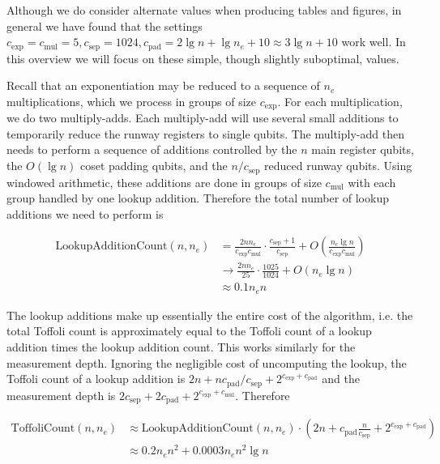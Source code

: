 \documentclass[superscriptaddress,notitlepage,longbibliography]{revtex4-1}
\theoremstyle{definition}
\theoremstyle{definition}
\newcommand{\lenexp}{{n_e}}
\newcommand{\gexp}{{c_{\text{exp}}}}
\newcommand{\gmul}{{c_{\text{mul}}}}
\newcommand{\gsep}{{c_{\text{sep}}}}
\newcommand{\gpad}{{c_{\text{pad}}}}
\begin{document}
Although we do consider alternate values when producing tables and figures, in general we have found that the settings $\gexp=\gmul=5, \gsep=1024, \gpad=2 \lg n + \lg \lenexp + 10 \approx 3 \lg n + 10$ work well.
In this overview we will focus on these simple, though slightly suboptimal, values.

Recall that an exponentiation may be reduced to a sequence of $\lenexp$ multiplications, which we process in groups of size $\gexp$.
For each multiplication, we do two multiply-adds.
Each multiply-add will use several small additions to temporarily reduce the runway registers to single qubits.
The multiply-add then needs to perform a sequence of additions controlled by the $n$ main register qubits, the $O(\lg n)$ coset padding qubits, and the $n/\gsep$ reduced runway qubits.
Using windowed arithmetic, these additions are done in groups of size $\gmul$ with each group handled by one lookup addition.
Therefore the total number of lookup additions we need to perform is

\begin{equation}
\begin{aligned}
    \text{LookupAdditionCount}(n, \lenexp)
    &= \frac{2 n \lenexp}{\gexp \gmul} \cdot \frac{\gsep + 1}{\gsep} + O\left( \frac{\lenexp \lg n}{\gexp \gmul} \right)
    \\&\rightarrow \frac{2 n \lenexp}{25} \cdot \frac{1025}{1024} + O\left(\lenexp \lg n\right)
    \\&\approx 0.1 \lenexp n
\end{aligned}
\end{equation}

The lookup additions make up essentially the entire cost of the algorithm, i.e.
the total Toffoli count is approximately equal to the Toffoli count of a lookup addition times the lookup addition count.
This works similarly for the measurement depth.
Ignoring the negligible cost of uncomputing the lookup, the Toffoli count of a lookup addition is $2n + n \gpad / \gsep + 2^{\gexp + \gpad}$ and the measurement depth is $2 \gsep + 2 \gpad + 2^{\gexp + \gmul}$.
Therefore

\begin{equation}
\begin{aligned}
    \text{ToffoliCount}(n, \lenexp)
    &\approx \text{LookupAdditionCount}(n, \lenexp) \cdot \left(2n + \gpad \frac{n}{\gsep} + 2^{\gexp + \gpad} \right)
    \\&\approx 0.2 \lenexp n^2 + 0.0003 \lenexp n^2 \lg n
\end{aligned}
\end{equation}
\end{document}
